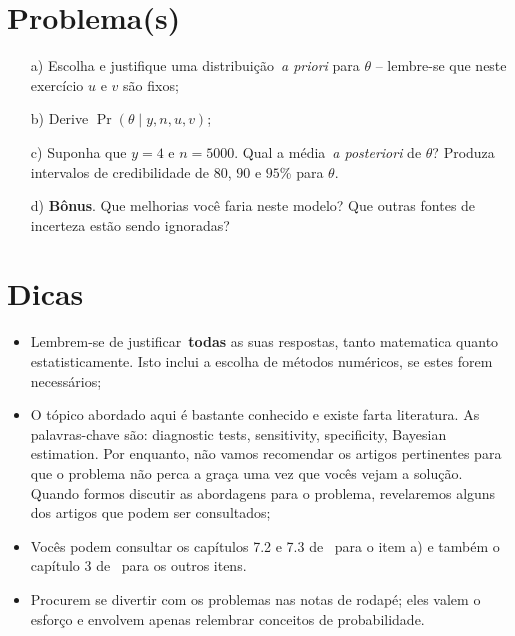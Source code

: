 \documentclass[a4paper, notitlepage, 10pt]{article}
\begin{document}
\section*{Problema(s)}
\begin{itemize}
 \item[a)] Escolha e justifique uma distribuição~\textit{a priori} para $\theta$ -- lembre-se que neste exercício $u$ e $v$ são fixos;
 \item[b)] Derive $\operatorname{Pr}(\theta \mid y, n, u, v)$;
 \item[c)] Suponha que $y = 4$ e $n = 5000$.
 Qual a média~\textit{a posteriori} de $\theta$?
 Produza intervalos de credibilidade de $80$, $90$ e $95$\% para $\theta$. 
 \item[d)] \textbf{Bônus}. Que melhorias você faria neste modelo? Que outras fontes de incerteza estão sendo ignoradas?
\end{itemize}

\section*{Dicas}
\begin{itemize}
 \item Lembrem-se de justificar~\textbf{todas} as suas respostas, tanto matematica quanto estatisticamente. 
 Isto inclui a escolha de métodos numéricos, se estes forem necessários;
 \item O tópico abordado aqui é bastante conhecido e existe farta literatura.
 As palavras-chave são: diagnostic tests, sensitivity, specificity, Bayesian estimation.
 Por enquanto, não vamos recomendar os artigos pertinentes para que o problema não perca a graça uma vez que vocês vejam a solução. 
 Quando formos discutir as abordagens para o problema, revelaremos alguns dos artigos que podem ser consultados;
 \item Vocês podem consultar os capítulos 7.2 e 7.3 de~\cite{DeGroot2012} para o item a) e também o capítulo 3 de~\cite{McElreath2020} para os outros itens.
 \item Procurem se divertir com os problemas nas notas de rodapé; eles valem o esforço e envolvem apenas relembrar conceitos de probabilidade.
\end{itemize}




\end{document}
